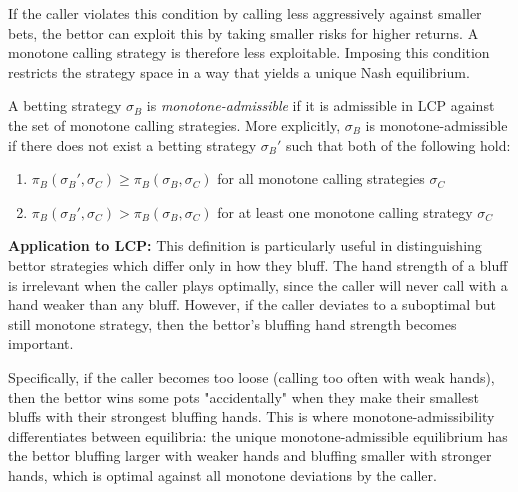 \documentclass[../../main/main.tex]{subfiles}
\begin{document}
If the caller violates this condition by calling less aggressively against smaller bets, the bettor can exploit this by taking smaller risks for higher returns. A monotone calling strategy is therefore less exploitable. Imposing this condition restricts the strategy space in a way that yields a unique Nash equilibrium.

\begin{definition}
    A betting strategy $\sigma_B$ is \textit{monotone-admissible} if it is admissible in LCP against the set of monotone calling strategies. More explicitly, $\sigma_B$ is monotone-admissible if there does not exist a betting strategy $\sigma_B'$ such that both of the following hold:
    \begin{enumerate}
        \item $\pi_B(\sigma_B',\sigma_C) \geq \pi_B(\sigma_B,\sigma_C)$ for all monotone calling strategies $\sigma_C$
        \item $\pi_B(\sigma_B',\sigma_C) > \pi_B(\sigma_B,\sigma_C)$ for at least one monotone calling strategy $\sigma_C$
    \end{enumerate}
\end{definition}

\textbf{Application to LCP:} This definition is particularly useful in distinguishing bettor strategies which differ only in how they bluff. The hand strength of a bluff is irrelevant when the caller plays optimally, since the caller will never call with a hand weaker than any bluff. However, if the caller deviates to a suboptimal but still monotone strategy, then the bettor's bluffing hand strength becomes important.

Specifically, if the caller becomes too loose (calling too often with weak hands), then the bettor wins some pots "accidentally" when they make their smallest bluffs with their strongest bluffing hands. This is where monotone-admissibility differentiates between equilibria: the unique monotone-admissible equilibrium has the bettor bluffing larger with weaker hands and bluffing smaller with stronger hands, which is optimal against all monotone deviations by the caller.
\end{document}
